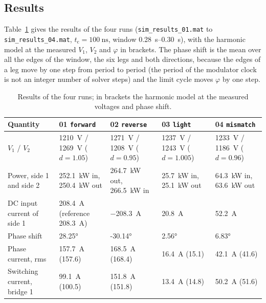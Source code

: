 \documentclass[12pt,a4paper]{scrartcl}
\newcommand{\ped}[1]{_{\mathrm{#1}}}
\newcommand{\code}[1]{\texttt{#1}}
\begin{document}
\begin{onehalfspace}
\subsection{Results}
\label{sec:results}

Table~\ref{tab:runs} gives the results of the four runs (\code{sim\_results\_01.mat} to \code{sim\_results\_04.mat}, $t\ped{c} = \SI{100}{\nano\second}$, window \SIrange{0.28}{0.30}{\second}), with the harmonic model at the measured $V\ped{1}$, $V\ped{2}$ and $\varphi$ in brackets. The phase shift is the mean over all the edges of the window, the six legs and both directions, because the edges of a leg move by one step from period to period (the period of the modulator clock is not an integer number of solver steps) and the limit cycle moves $\varphi$ by one step.

\begin{table}[H]
	\centering
	\captionsetup{width=0.95\textwidth, font=small}
	\caption[Results of the four runs.]{Results of the four runs; in brackets the harmonic model at the measured voltages and phase shift.}
	\label{tab:runs}
	\scriptsize
	\begin{tabularx}{\textwidth}{@{} >{\raggedright\arraybackslash}p{} X X X X @{}}
		\toprule
		\textbf{Quantity} & \textbf{01 \code{forward}} & \textbf{02 \code{reverse}} & \textbf{03 \code{light}} & \textbf{04 \code{mismatch}} \\
		\midrule
		$V\ped{1}$ / $V\ped{2}$ & \SI{1210}{\volt} / \SI{1269}{\volt} ($d = 1.05$) & \SI{1271}{\volt} / \SI{1208}{\volt} ($d = 0.95$) & \SI{1237}{\volt} / \SI{1243}{\volt} ($d = 1.005$) & \SI{1233}{\volt} / \SI{1186}{\volt} ($d = 0.96$) \\
		Power, side 1 and side 2 & \SI{252.1}{\kilo\watt} in, \SI{250.4}{\kilo\watt} out & \SI{264.7}{\kilo\watt} out, \SI{266.5}{\kilo\watt} in & \SI{25.7}{\kilo\watt} in, \SI{25.1}{\kilo\watt} out & \SI{64.3}{\kilo\watt} in, \SI{63.6}{\kilo\watt} out \\
		DC input current of side 1 & \SI{208.4}{\ampere} (reference \SI{208.3}{\ampere}) & \SI{-208.3}{\ampere} & \SI{20.8}{\ampere} & \SI{52.2}{\ampere} \\
		Phase shift & \ang{28.25} & \ang{-30.14} & \ang{2.56} & \ang{6.83} \\
		Phase current, rms & \SI{157.7}{\ampere} (157.6) & \SI{168.5}{\ampere} (168.4) & \SI{16.4}{\ampere} (15.1) & \SI{42.1}{\ampere} (41.6) \\
		Switching current, bridge 1 & \SI{99.1}{\ampere} (100.5) & \SI{151.8}{\ampere} (151.8) & \SI{13.4}{\ampere} (14.8) & \SI{50.2}{\ampere} (51.6) \\

\end{tabularx}
\end{table}
\end{onehalfspace}
\end{document}
